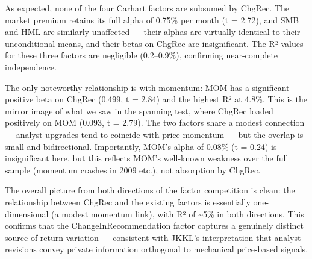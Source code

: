 \documentclass[
  letterpaper,
  DIV=11,
  numbers=noendperiod]{scrartcl}
\begin{document}
As expected, none of the four Carhart factors are subsumed by ChgRec.
The market premium retains its full alpha of 0.75\% per month (t =
2.72), and SMB and HML are similarly unaffected --- their alphas are
virtually identical to their unconditional means, and their betas on
ChgRec are insignificant. The R² values for these three factors are
negligible (0.2--0.9\%), confirming near-complete independence.

The only noteworthy relationship is with momentum: MOM has a significant
positive beta on ChgRec (0.499, t = 2.84) and the highest R² at 4.8\%.
This is the mirror image of what we saw in the spanning test, where
ChgRec loaded positively on MOM (0.093, t = 2.79). The two factors share
a modest connection --- analyst upgrades tend to coincide with price
momentum --- but the overlap is small and bidirectional. Importantly,
MOM's alpha of 0.08\% (t = 0.24) is insignificant here, but this
reflects MOM's well-known weakness over the full sample (momentum
crashes in 2009 etc.), not absorption by ChgRec.

The overall picture from both directions of the factor competition is
clean: the relationship between ChgRec and the existing factors is
essentially one-dimensional (a modest momentum link), with R² of
\textasciitilde5\% in both directions. This confirms that the
ChangeInRecommendation factor captures a genuinely distinct source of
return variation --- consistent with JKKL's interpretation that analyst
revisions convey private information orthogonal to mechanical
price-based signals.
\end{document}
